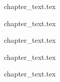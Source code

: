 
{chapter_text.tex}

{chapter_text.tex}

{chapter_text.tex}

{chapter_text.tex}

{chapter_text.tex}



